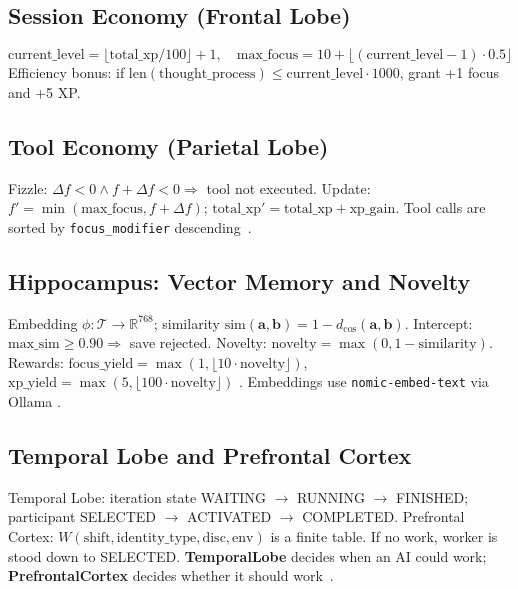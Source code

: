 \documentclass[11pt]{article}
\begin{document}
	\subsection{Session Economy (Frontal Lobe)}
	\cite{talosCombined,talosFrontal}
	$$
	\text{current\_level} = \lfloor \text{total\_xp} / 100 \rfloor + 1, \quad
	\text{max\_focus} = 10 + \lfloor (\text{current\_level} - 1) \cdot 0.5 \rfloor
	$$
	Efficiency bonus: if $\text{len}(\text{thought\_process}) \leq \text{current\_level} \cdot 1000$, grant +1 focus and +5 XP.

	\subsection{Tool Economy (Parietal Lobe)}
	Fizzle: $\Delta f < 0 \land f + \Delta f < 0 \Rightarrow$ tool not executed. Update: $f' = \min(\text{max\_focus}, f + \Delta f)$; $\text{total\_xp}' = \text{total\_xp} + \text{xp\_gain}$. Tool calls are sorted by \texttt{focus\_modifier} descending~\cite{talosParietal,talosCombined}.

	\subsection{Hippocampus: Vector Memory and Novelty}
	Embedding $\phi : \mathcal{T} \to \mathbb{R}^{768}$; similarity $\text{sim}(\mathbf{a}, \mathbf{b}) = 1 - d_{\cos}(\mathbf{a}, \mathbf{b})$. Intercept: $\text{max\_sim} \geq 0.90 \Rightarrow$ save rejected. Novelty: $\text{novelty} = \max(0, 1 - \text{similarity})$. Rewards: $\text{focus\_yield} = \max(1, \lfloor 10 \cdot \text{novelty} \rfloor)$, $\text{xp\_yield} = \max(5, \lfloor 100 \cdot \text{novelty} \rfloor)$ \cite{talosHippocampus,talosCombined}. Embeddings use \texttt{nomic-embed-text} via Ollama \cite{talosHippocampus}.

	\subsection{Temporal Lobe and Prefrontal Cortex}
	Temporal Lobe: iteration state WAITING $\to$ RUNNING $\to$ FINISHED; participant SELECTED $\to$ ACTIVATED $\to$ COMPLETED. Prefrontal Cortex: $W(\text{shift}, \text{identity\_type}, \text{disc}, \text{env})$ is a finite table. If no work, worker is stood down to SELECTED. \textbf{TemporalLobe} decides when an AI could work; \textbf{PrefrontalCortex} decides whether it should work~\cite{talosTemporal,talosPFC,talosCombined}.
\end{document}
